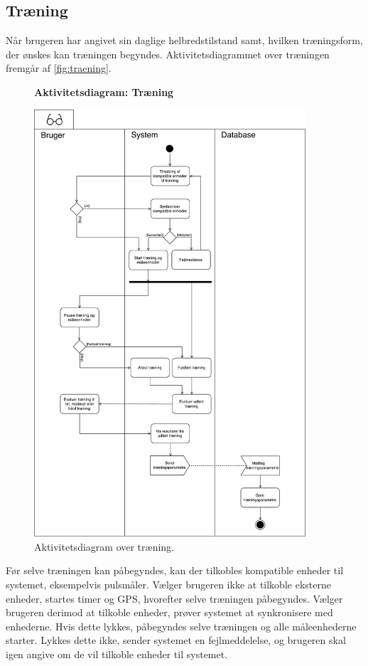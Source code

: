 \subsection*{Træning} \label{sec:traening}
Når brugeren har angivet sin daglige helbredstilstand samt, hvilken træningsform, der ønskes kan træningen begyndes. Aktivitetsdiagrammet over træningen fremgår af \autoref{fig:traening}. 

\begin{figure} [H]
\centering
\textbf{Aktivitetsdiagram: Træning}\par\medskip
\includegraphics[width=0.9\textwidth]{figures/aktivitetsdiagram/Traening}
\caption{Aktivitetsdiagram over træning.}
\label{fig:traening}
\end{figure}

\noindent
Før selve træningen kan påbegyndes, kan der tilkobles kompatible enheder til systemet, eksempelvis pulsmåler. Vælger brugeren ikke at tilkoble eksterne enheder, startes timer og GPS, hvorefter selve træningen påbegyndes. Vælger brugeren derimod at tilkoble enheder, prøver systemet at synkronisere med enhederne.  Hvis dette lykkes, påbegyndes selve træningen og alle måleenhederne starter. Lykkes dette ikke, sender systemet en fejlmeddelelse, og brugeren skal igen angive om de vil tilkoble enheder til systemet.

